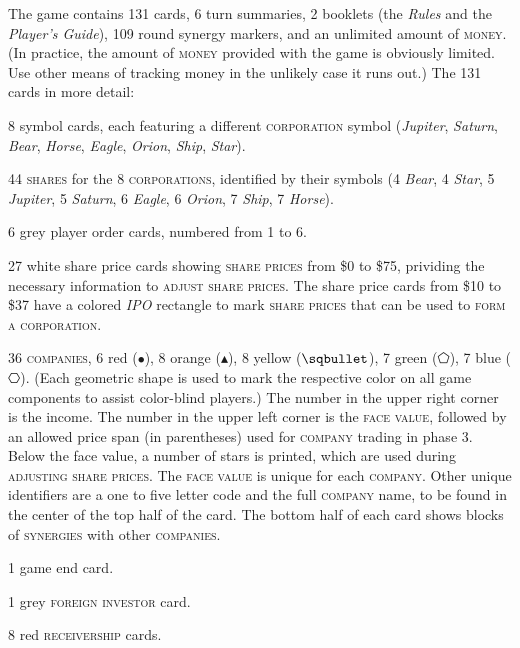 \documentclass[11pt,a4paper]{article}
\newenvironment{my_itemize}
{\begin{list}{\labelitemi}{\leftmargin=1.2em}
  \setlength{\itemsep}{1pt}
  \setlength{\parskip}{0pt}
  \setlength{\parsep}{0pt}}
{\end{list}}
\begin{document}
\begin{multicols}{2}
{The game contains 131 cards, 6 turn summaries, 2 booklets (the
\emph{Rules} and the \emph{Player's Guide}), 109 round synergy
markers, and an unlimited amount of \textsc{money}. (In practice, the
amount of \textsc{money} provided with the game is obviously
limited. Use other means of tracking money in the unlikely case it
runs out.) The 131 cards in more detail:
\begin{my_itemize}
\item 8 symbol cards, each featuring a different \textsc{corporation}
  symbol (\emph{Jupiter}, \emph{Saturn}, \emph{Bear}, \emph{Horse},
  \emph{Eagle}, \emph{Orion}, \emph{Ship}, \emph{Star}).
\item 44 \textsc{shares} for the 8 \textsc{corporations}, identified
  by their symbols (4 \emph{Bear}, 4 \emph{Star}, 5 \emph{Jupiter}, 5
  \emph{Saturn}, 6 \emph{Eagle}, 6 \emph{Orion}, 7 \emph{Ship}, 7
  \emph{Horse}).
\item 6 grey player order cards, numbered from 1 to 6.
\item 27 white share price cards showing \textsc{share prices} from
  \$0 to \$75, prividing the necessary information to \textsc{adjust
    share prices}. The share price cards from \$10 to \$37 have a
  colored \emph{IPO} rectangle to mark \textsc{share prices} that can
  be used to \textsc{form a corporation}.
\item 36 \textsc{companies}, 6 red ($\bullet$), 8 orange
  ($\blacktriangleup$), 8 yellow ($\sqbullet$), 7 green ($\pentagon$),
  7 blue ($\hexagon$). (Each geometric shape is used to mark the
  respective color on all game components to assist color-blind
  players.) The number in the upper right corner is the income. The
  number in the upper left corner is the \textsc{face value}, followed
  by an allowed price span (in parentheses) used for \textsc{company}
  trading in phase 3. Below the face value, a number of stars is
  printed, which are used during \textsc{adjusting share prices}. The
  \textsc{face value} is unique for each \textsc{company}. Other
  unique identifiers are a one to five letter code and the full
  \textsc{company} name, to be found in the center of the top half of
  the card. The bottom half of each card shows blocks of
  \textsc{synergies} with other \textsc{companies}.
\item 1 game end card.
\item 1 grey \textsc{foreign investor} card.
\item 8 red \textsc{receivership} cards.
\end{my_itemize}

}
\end{multicols}
\end{document}
